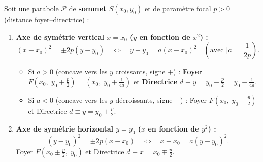 \begin{theoreme}
Soit une parabole $\mathcal{P}$ de \textbf{sommet $S(x_0, y_0)$} et de paramètre focal $p > 0$ (distance foyer--directrice) :
\begin{enumerate}
    \item \textbf{Axe de symétrie vertical $x = x_0$ ($y$ en fonction de $x^2$) :}
    \[
        \boxed{(x - x_0)^2 = \pm 2p(y - y_0) \quad \Longleftrightarrow \quad y - y_0 = a(x - x_0)^2} \quad \left(\text{avec } |a| = \frac{1}{2p}\right).
    \]
    \begin{itemize}
        \item Si $a > 0$ (concave vers les $y$ croissants, signe $+$) : \textbf{Foyer} $F\left(x_0,\; y_0 + \frac{p}{2}\right) = \left(x_0,\; y_0 + \frac{1}{4a}\right)$ et \textbf{Directrice} $d \equiv y = y_0 - \frac{p}{2} = y_0 - \frac{1}{4a}$.
        \item Si $a < 0$ (concave vers les $y$ décroissants, signe $-$) : Foyer $F\left(x_0,\; y_0 - \frac{p}{2}\right)$ et Directrice $d \equiv y = y_0 + \frac{p}{2}$.
    \end{itemize}
    \item \textbf{Axe de symétrie horizontal $y = y_0$ ($x$ en fonction de $y^2$) :}
    \[
        \boxed{(y - y_0)^2 = \pm 2p(x - x_0) \quad \Longleftrightarrow \quad x - x_0 = a(y - y_0)^2}.
    \]
    Foyer $F\left(x_0 \pm \frac{p}{2},\; y_0\right)$ et Directrice $d \equiv x = x_0 \mp \frac{p}{2}$.
\end{enumerate}
\end{theoreme}

